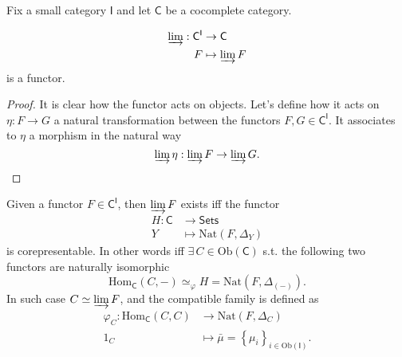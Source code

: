 Fix a small category $\mathsf{I}$ and let $\mathsf{C}$ be a cocomplete category.
\begin{prop}
	\begin{align}
		\varinjlim: \mathsf{C}^{\mathsf{I}} &\to \mathsf{C} \\
		F &\mapsto \varinjlim F
	\end{align} 
	is a functor.
\end{prop} 
\begin{proof}
	It is clear how the functor acts on objects.
	Let's define how it acts on $\eta: F \to G$ a natural transformation between the functors $F, G \in \mathsf{C}^{\mathsf{I}}$.
	It associates to $\eta$ a morphism in the natural way
	\begin{equation*}
	\varinjlim \eta: \varinjlim F \to \varinjlim G.\qedhere
	\end{equation*} 
\end{proof}

\begin{prop}
	Given a functor $F \in \mathsf{C}^{\mathsf{I}}$, then $\varinjlim F$ exists iff the functor
	\begin{align}
		H: \mathsf{C} &\to \mathsf{Sets} \\
		Y &\mapsto \mathrm{Nat} \left( F, \Delta_Y \right)
	\end{align} 
	is corepresentable.
	In other words iff $\exists\, C \in \mathrm{Ob} \left(\mathsf{C}\right)$ s.t.
	the following two functors are naturally isomorphic
	\begin{equation}
		\mathrm{Hom}_{\mathsf{C}} \left( C, - \right) \simeq_{\varphi} H = \mathrm{Nat} \left( F, \Delta_{(-)} \right)
	.\end{equation} 
	In such case $C \simeq \varinjlim F$, and the compatible family is defined as
	\begin{align}
		\varphi_C: \mathrm{Hom}_{\mathsf{C}} \left( C, C \right) &\to \mathrm{Nat} \left( F, \Delta_C \right) \\
		1_C &\mapsto \bar{\mu} = \left\{ \mu_i \right\}_{i \in \mathrm{Ob} \left(\mathsf{I}\right)} 
	.\end{align} 
\end{prop} 

